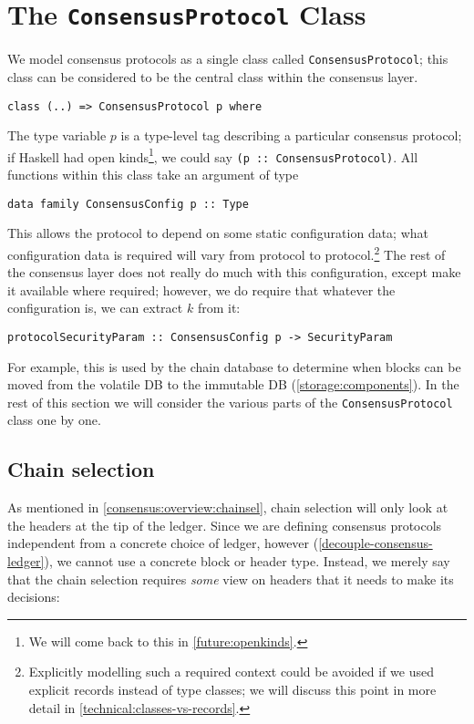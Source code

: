 \section{The \lstinline!ConsensusProtocol! Class}
\label{consensus:class}

We model consensus protocols as a single class called
\lstinline!ConsensusProtocol!; this class can be considered to be the
central class within the consensus layer.

\begin{lstlisting}
class (..) => ConsensusProtocol p where
\end{lstlisting}

The type variable $p$ is a type-level tag describing a particular consensus
protocol; if Haskell had open kinds\footnote{We will come back to this in
\cref{future:openkinds}.}, we could say \lstinline!(p :: ConsensusProtocol)!.
All functions within this class take an argument of type
%
\begin{lstlisting}
data family ConsensusConfig p :: Type
\end{lstlisting}
%
This allows the protocol to depend on some static configuration data; what
configuration data is required will vary from protocol to
protocol.\footnote{Explicitly modelling such a required context could be avoided
if we used explicit records instead of type classes; we will discuss this point
in more detail in \cref{technical:classes-vs-records}.}  The rest of the
consensus layer does not really do much with this configuration, except make it
available where required; however, we do require that whatever the configuration
is, we can extract $k$ from it:
%
\begin{lstlisting}
protocolSecurityParam :: ConsensusConfig p -> SecurityParam
\end{lstlisting}
%
For example, this is used by the chain database to determine when blocks can be
moved from the volatile DB to the immutable DB (\cref{storage:components}). In
the rest of this section we will consider the various parts of the
\lstinline!ConsensusProtocol! class one by one.

\subsection{Chain selection}
\label{consensus:class:chainsel}

As mentioned in \cref{consensus:overview:chainsel}, chain selection will only
look at the headers at the tip of the ledger. Since we are defining consensus
protocols independent from a concrete choice of ledger, however
(\cref{decouple-consensus-ledger}), we cannot use a concrete block or header
type. Instead, we merely say that the chain selection requires \emph{some} view
on headers that it needs to make its decisions:

